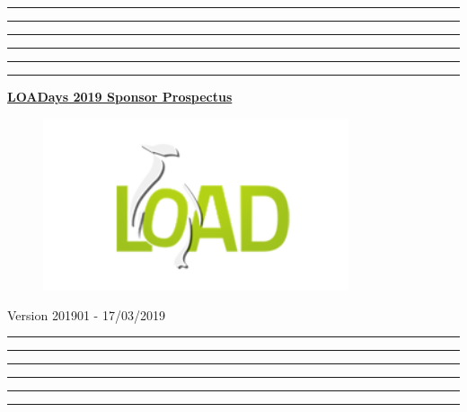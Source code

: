 \documentclass[a4paper,12pt]{article}
\begin{document}
\makeatletter
\renewcommand{\maketitle}{
    \begin{titlepage}
        \thispagestyle{empty}
        \pagenumbering{empty}
        \begin{center}
            \hrule\hrule\hrule\hrule\hrule\hrule
            \vspace{2.5cm}
            \Large{\underline{\textbf{LOADays 2019 Sponsor Prospectus}}}\\
        \end{center}
        \begin{figure}[h!]
            \centering
            \includegraphics[width=9cm]{images/loadays.png}
        \end{figure}
        \begin{center}
            \vspace{3.5cm}
            \scriptsize{Version 201901 - 17/03/2019}
            \hrule\hrule\hrule\hrule\hrule\hrule
        \end{center}
    \end{titlepage}
}
\maketitle

\pagestyle{fancy}
\setcounter{page}{1}
\fancyhead{}
\fancyhead[C]{}
\fancyfoot{}
\fancyfoot[C]{\bfseries\thepage}

%
\def\confdates{4th and 5th May 2019}

%

\end{document}
